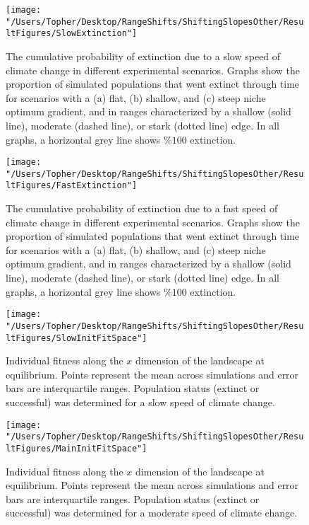 \documentclass[11pt]{article}
\begin{document}
\clearpage

\renewcommand{\thefigure}{B\arabic{figure}}
\setcounter{figure}{0}

\begin{figure}[h!]
\texttt{[image: "/Users/Topher/Desktop/RangeShifts/ShiftingSlopesOther/ResultFigures/SlowExtinction"]}
\caption{The cumulative probability of extinction due to a slow speed of climate change in different experimental scenarios. Graphs show the proportion of simulated populations that went extinct through time for scenarios with a (a) flat, (b) shallow, and (c) steep niche optimum gradient, and in ranges characterized by a shallow (solid line), moderate (dashed line), or stark (dotted line) edge. In all graphs, a horizontal grey line shows $\%100$ extinction.}
\label{Fig:ExtProbSlow}
\end{figure}

\clearpage

\begin{figure}[h!]
\texttt{[image: "/Users/Topher/Desktop/RangeShifts/ShiftingSlopesOther/ResultFigures/FastExtinction"]}
\caption{The cumulative probability of extinction due to a fast speed of climate change in different experimental scenarios. Graphs show the proportion of simulated populations that went extinct through time for scenarios with a (a) flat, (b) shallow, and (c) steep niche optimum gradient, and in ranges characterized by a shallow (solid line), moderate (dashed line), or stark (dotted line) edge. In all graphs, a horizontal grey line shows $\%100$ extinction.}
\label{Fig:ExtProbFast}
\end{figure}

\clearpage

\begin{figure}[h!]
\texttt{[image: "/Users/Topher/Desktop/RangeShifts/ShiftingSlopesOther/ResultFigures/SlowInitFitSpace"]}
\caption{Individual fitness along the $x$ dimension of the landscape at equilibrium. Points represent the mean across simulations and error bars are interquartile ranges. Population status (extinct or successful) was determined for a slow speed of climate change.}
\label{Fig:InitFitSlow}
\end{figure}

\clearpage

\begin{figure}[h!]
\texttt{[image: "/Users/Topher/Desktop/RangeShifts/ShiftingSlopesOther/ResultFigures/MainInitFitSpace"]}
\caption{Individual fitness along the $x$ dimension of the landscape at equilibrium. Points represent the mean across simulations and error bars are interquartile ranges. Population status (extinct or successful) was determined for a moderate speed of climate change.}
\label{Fig:InitFit}
\end{figure}
\end{document}
